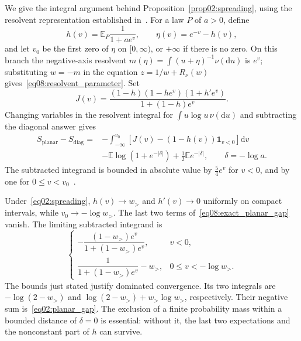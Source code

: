 \documentclass[11pt,letterpaper]{article}
\newcommand{\E}{\mathbb{E}}
\newcommand{\dd}{\mathrm{d}}
\theoremstyle{plain}
\theoremstyle{definition}
\theoremstyle{remark}
\begin{document}
We give the integral argument behind Proposition~\ref{prop02:spreading}, using the resolvent representation established in~\cite{wuebben2026}. For a law $P$ of $a>0$, define
\begin{equation}
 h(v)=\E_P\frac{1}{1+ae^v},\qquad
 \eta(v)=e^{-v}-h(v),
 \label{eq08:resolvent_parameter}
\end{equation}
and let $v_0$ be the first zero of $\eta$ on $[0,\infty)$, or $+\infty$ if there is no zero. On this branch the negative-axis resolvent $m(\eta)=\int(u+\eta)^{-1}\nu(\dd u)$ is $e^v$; substituting $w=-m$ in the equation $z=1/w+R_\nu(w)$ gives~\eqref{eq08:resolvent_parameter}. Set
\begin{equation}
 J(v)=\frac{(1-h)(1-he^v)(1+h'e^v)}{1+(1-h)e^v}.
 \label{eq08:entropy_integrand}
\end{equation}
Changing variables in the resolvent integral for $\int u\log u\,\nu(\dd u)$ and subtracting the diagonal answer gives
\begin{align}
 S_{\mathrm{planar}}-S_{\mathrm{diag}}
 ={}&-\int_{-\infty}^{v_0}
 \left[J(v)-(1-h(v))\boldsymbol{1}_{v<0}\right]\dd v
 \nonumber\\
 &-\E\log(1+e^{-|\delta|})
 +\frac12\E e^{-|\delta|},
 \qquad \delta=-\log a.
 \label{eq08:exact_planar_gap}
\end{align}
The subtracted integrand is bounded in absolute value by $\tfrac54e^v$ for $v<0$, and by one for $0\leq v<v_0$~\cite{wuebben2026}.

Under~\eqref{eq02:spreading}, $h(v)\to w_>$ and $h'(v)\to0$ uniformly on compact intervals, while $v_0\to-\log w_>$. The last two terms of~\eqref{eq08:exact_planar_gap} vanish. The limiting subtracted integrand is
\begin{equation}
 \begin{cases}
 -\dfrac{(1-w_>)e^v}{1+(1-w_>)e^v},&v<0,\\[2mm]
 \dfrac{1}{1+(1-w_>)e^v}-w_>,&0\leq v<-\log w_>.
 \end{cases}
 \label{eq08:limiting_integrand}
\end{equation}
The bounds just stated justify dominated convergence. Its two integrals are $-\log(2-w_>)$ and $\log(2-w_>)+w_>\log w_>$, respectively. Their negative sum is~\eqref{eq02:planar_gap}. The exclusion of a finite probability mass within a bounded distance of $\delta=0$ is essential: without it, the last two expectations and the nonconstant part of $h$ can survive.
\end{document}
